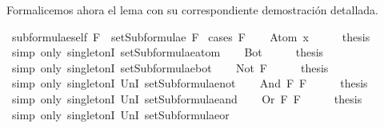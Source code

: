 \begin{isabellebody}
\begin{isamarkuptext}
  Formalicemos ahora el lema con su correspondiente demostración 
  detallada.%
\end{isamarkuptext}\isamarkuptrue%
\isamarkupfalse%
\ subformulae{\isacharunderscore}self{\isacharcolon}\ {\isachardoublequoteopen}F\ {\isasymin}\ setSubformulae\ F{\isachardoublequoteclose}\isanewline
%
\isadelimproof
%
\endisadelimproof
%
\isatagproof
{}\isamarkupfalse%
\ {\isacharparenleft}cases\ F{\isacharparenright}\isanewline
\ \ \isamarkupfalse%
\ {\isacharparenleft}Atom\ x{}{\isacharparenright}\isanewline
\ \ \isamarkupfalse%
\ \isamarkupfalse%
\ {\isacharquery}thesis\ \isanewline
\ \ \ \ \isamarkupfalse%
\ {\isacharparenleft}simp\ only{\isacharcolon}\ singletonI\ setSubformulae{\isacharunderscore}atom{\isacharparenright}\isanewline
{}\isamarkupfalse%
\isanewline
\ \ \isamarkupfalse%
\ Bot\isanewline
\ \ \isamarkupfalse%
\ \isamarkupfalse%
\ {\isacharquery}thesis\isanewline
\ \ \ \ \isamarkupfalse%
\ {\isacharparenleft}simp\ only{\isacharcolon}\ singletonI\ setSubformulae{\isacharunderscore}bot{\isacharparenright}\isanewline
{}\isamarkupfalse%
\isanewline
\ \ \isamarkupfalse%
\ {\isacharparenleft}Not\ F{\isacharparenright}\isanewline
\ \ \isamarkupfalse%
\ \isamarkupfalse%
\ {\isacharquery}thesis\isanewline
\ \ \ \ \isamarkupfalse%
\ {\isacharparenleft}simp\ only{\isacharcolon}\ singletonI\ UnI{}\ setSubformulae{\isacharunderscore}not{\isacharparenright}\isanewline
{}\isamarkupfalse%
\isanewline
\ \ \isamarkupfalse%
\ {\isacharparenleft}And\ F{}\ F{}{\isacharparenright}\isanewline
\ \ \isamarkupfalse%
\ \isamarkupfalse%
\ {\isacharquery}thesis\isanewline
\ \ \ \isamarkupfalse%
\ {\isacharparenleft}simp\ only{\isacharcolon}\ singletonI\ UnI{}\ setSubformulae{\isacharunderscore}and{\isacharparenright}\isanewline
{}\isamarkupfalse%
\isanewline
\ \ \isamarkupfalse%
\ {\isacharparenleft}Or\ F{}\ F{}{\isacharparenright}\isanewline
\ \ \isamarkupfalse%
\ \isamarkupfalse%
\ {\isacharquery}thesis\isanewline
\ \ \ \isamarkupfalse%
\ {\isacharparenleft}simp\ only{\isacharcolon}\ singletonI\ UnI{}\ setSubformulae{\isacharunderscore}or{\isacharparenright}\isanewline

\end{isabellebody}
